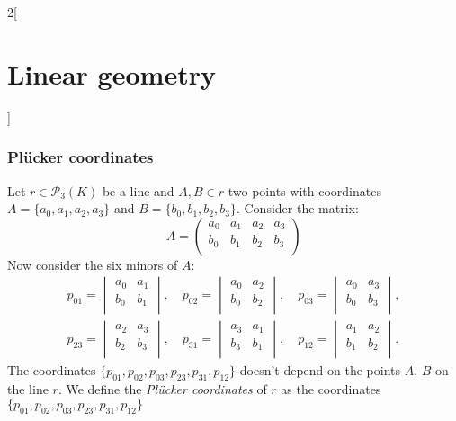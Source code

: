 \documentclass[../../../main.tex]{subfiles}
\begin{document}
\begin{multicols}{2}[\section{Linear geometry}]
  \subsubsection{Plücker coordinates}
  \begin{proposition}
    Let $r\in\mathcal{P}_3(K)$ be a line and $A,B\in r$ two points with coordinates $A=\{a_0,a_1,a_2,a_3\}$ and $B=\{b_0,b_1,b_2,b_3\}$. Consider the matrix: $$A=\begin{pmatrix}
        a_0 & a_1 & a_2 & a_3 \\
        b_0 & b_1 & b_2 & b_3 \\
      \end{pmatrix}$$ Now consider the six minors of $A$:
    \begin{gather*}
      p_{01}=\begin{vmatrix}
        a_0 & a_1 \\
        b_0 & b_1 \\
      \end{vmatrix},\quad p_{02}=\begin{vmatrix}
        a_0 & a_2 \\
        b_0 & b_2 \\
      \end{vmatrix},\quad p_{03}=\begin{vmatrix}
        a_0 & a_3 \\
        b_0 & b_3 \\
      \end{vmatrix},\\ p_{23}=\begin{vmatrix}
        a_2 & a_3 \\
        b_2 & b_3 \\
      \end{vmatrix},\quad p_{31}=\begin{vmatrix}
        a_3 & a_1 \\
        b_3 & b_1 \\
      \end{vmatrix},\quad p_{12}=\begin{vmatrix}
        a_1 & a_2 \\
        b_1 & b_2 \\
      \end{vmatrix}.
    \end{gather*}
    The coordinates $\{p_{01},p_{02},p_{03},p_{23},p_{31},p_{12}\}$ doesn't depend on the points $A$, $B$ on the line $r$. We define the \emph{Plücker coordinates} of $r$ as the coordinates $\{p_{01},p_{02},p_{03},p_{23},p_{31},p_{12}\}$

\end{proposition}
\end{multicols}
\end{document}
